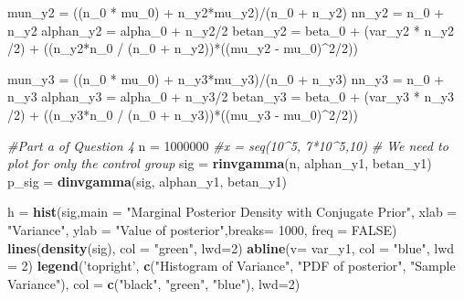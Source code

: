 \documentclass[]{article}
\newenvironment{Shaded}{\begin{snugshade}}{\end{snugshade}}
\newcommand{\KeywordTok}[1]{\textcolor[rgb]{0.13,0.29,0.53}{\textbf{{#1}}}}
\newcommand{\DataTypeTok}[1]{\textcolor[rgb]{0.13,0.29,0.53}{{#1}}}
\newcommand{\DecValTok}[1]{\textcolor[rgb]{0.00,0.00,0.81}{{#1}}}
\newcommand{\StringTok}[1]{\textcolor[rgb]{0.31,0.60,0.02}{{#1}}}
\newcommand{\CommentTok}[1]{\textcolor[rgb]{0.56,0.35,0.01}{\textit{{#1}}}}
\newcommand{\OtherTok}[1]{\textcolor[rgb]{0.56,0.35,0.01}{{#1}}}
\newcommand{\NormalTok}[1]{{#1}}
\begin{document}
\begin{Shaded}
\begin{Highlighting}[]
\NormalTok{mun_y2 =}\StringTok{ }\NormalTok{((n_0 *}\StringTok{ }\NormalTok{mu_0) +}\StringTok{ }\NormalTok{n_y2*mu_y2)/(n_0 +}\StringTok{ }\NormalTok{n_y2)}
\NormalTok{nn_y2 =}\StringTok{ }\NormalTok{n_0 +}\StringTok{ }\NormalTok{n_y2}
\NormalTok{alphan_y2 =}\StringTok{ }\NormalTok{alpha_0 +}\StringTok{ }\NormalTok{n_y2/}\DecValTok{2}
\NormalTok{betan_y2 =}\StringTok{ }\NormalTok{beta_0 +}\StringTok{ }\NormalTok{(var_y2 *}\StringTok{ }\NormalTok{n_y2 /}\DecValTok{2}\NormalTok{) +}\StringTok{ }\NormalTok{((n_y2*n_0 /}\StringTok{ }\NormalTok{(n_0 +}\StringTok{ }\NormalTok{n_y2))*((mu_y2 -}\StringTok{ }\NormalTok{mu_0)^}\DecValTok{2}\NormalTok{/}\DecValTok{2}\NormalTok{))}

\NormalTok{mun_y3 =}\StringTok{ }\NormalTok{((n_0 *}\StringTok{ }\NormalTok{mu_0) +}\StringTok{ }\NormalTok{n_y3*mu_y3)/(n_0 +}\StringTok{ }\NormalTok{n_y3)}
\NormalTok{nn_y3 =}\StringTok{ }\NormalTok{n_0 +}\StringTok{ }\NormalTok{n_y3}
\NormalTok{alphan_y3 =}\StringTok{ }\NormalTok{alpha_0 +}\StringTok{ }\NormalTok{n_y3/}\DecValTok{2}
\NormalTok{betan_y3 =}\StringTok{ }\NormalTok{beta_0 +}\StringTok{ }\NormalTok{(var_y3 *}\StringTok{ }\NormalTok{n_y3 /}\DecValTok{2}\NormalTok{) +}\StringTok{ }\NormalTok{((n_y3*n_0 /}\StringTok{ }\NormalTok{(n_0 +}\StringTok{ }\NormalTok{n_y3))*((mu_y3 -}\StringTok{ }\NormalTok{mu_0)^}\DecValTok{2}\NormalTok{/}\DecValTok{2}\NormalTok{))}


\CommentTok{#Part a of Question 4}
\NormalTok{n =}\StringTok{ }\DecValTok{1000000}
\CommentTok{#x = seq(10^5, 7*10^5,10)}
\CommentTok{# We need to plot for only the control group}
\NormalTok{sig =}\StringTok{ }\KeywordTok{rinvgamma}\NormalTok{(n, alphan_y1, betan_y1)}
\NormalTok{p_sig =}\StringTok{ }\KeywordTok{dinvgamma}\NormalTok{(sig, alphan_y1, betan_y1)}

\NormalTok{h =}\StringTok{ }\KeywordTok{hist}\NormalTok{(sig,}\DataTypeTok{main =} \StringTok{"Marginal Posterior Density with Conjugate Prior"}\NormalTok{, }\DataTypeTok{xlab =} \StringTok{"Variance"}\NormalTok{, }\DataTypeTok{ylab =} \StringTok{"Value of posterior"}\NormalTok{,}\DataTypeTok{breaks=} \DecValTok{1000}\NormalTok{, }\DataTypeTok{freq =} \OtherTok{FALSE}\NormalTok{)}
\KeywordTok{lines}\NormalTok{(}\KeywordTok{density}\NormalTok{(sig), }\DataTypeTok{col =} \StringTok{"green"}\NormalTok{, }\DataTypeTok{lwd=}\DecValTok{2}\NormalTok{)}
\KeywordTok{abline}\NormalTok{(}\DataTypeTok{v=} \NormalTok{var_y1, }\DataTypeTok{col =} \StringTok{"blue"}\NormalTok{, }\DataTypeTok{lwd =} \DecValTok{2}\NormalTok{)}
\KeywordTok{legend}\NormalTok{(}\StringTok{'topright'}\NormalTok{, }\KeywordTok{c}\NormalTok{(}\StringTok{"Histogram of Variance"}\NormalTok{, }\StringTok{"PDF of posterior"}\NormalTok{, }\StringTok{"Sample Variance"}\NormalTok{), }\DataTypeTok{col =} \KeywordTok{c}\NormalTok{(}\StringTok{"black"}\NormalTok{, }\StringTok{"green"}\NormalTok{, }\StringTok{"blue"}\NormalTok{), }\DataTypeTok{lwd=}\DecValTok{2}\NormalTok{)}
\end{Highlighting}
\end{Shaded}
\end{document}
